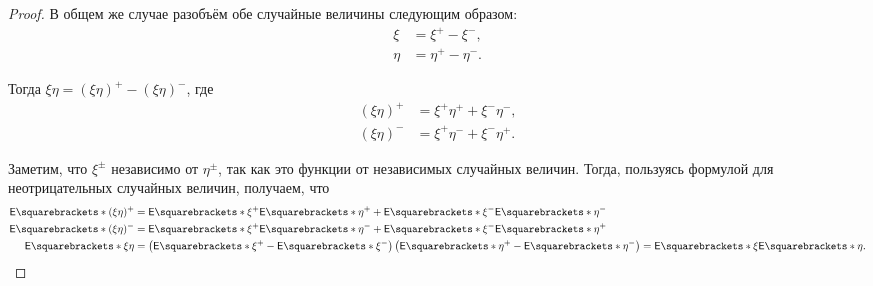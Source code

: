 \begin{proof}
	В общем же случае разобъём обе случайные величины следующим образом:
	\begin{align}
		\xi &= \xi^{+} - \xi^{-}, \\
		\eta &= \eta^{+} - \eta^{-}.
	\end{align}
	
	Тогда \(\xi\eta = (\xi\eta)^{+} - (\xi\eta)^{-}\), где
	\begin{align}
		(\xi\eta)^{+} &= \xi^{+}\eta^{+} + \xi^{-}\eta^{-}, \\
		(\xi\eta)^{-} &= \xi^{+}\eta^{-} + \xi^{-}\eta^{+}.
	\end{align}
	
	Заметим, что \(\xi^{\pm}\) независимо от \(\eta^{\pm}\), так как это функции от независимых случайных величин. Тогда, пользуясь формулой для неотрицательных случайных величин, получаем, что
	\begin{align}
		\E{(\xi\eta)^{+}} &= \E{\xi^{+}}\E{\eta^{+}} + \E{\xi^{-}}\E{\eta^{-}} \\
		\E{(\xi\eta)^{-}} &= \E{\xi^{+}}\E{\eta^{-}} + \E{\xi^{-}}\E{\eta^{+}} \\
		\E{\xi\eta} &= \left(\E{\xi^{+}} - \E{\xi^{-}}\right)\left(\E{\eta^{+}} - \E{\eta^{-}}\right) = \E{\xi} \E{\eta}.\qedhere
	\end{align}
\end{proof}